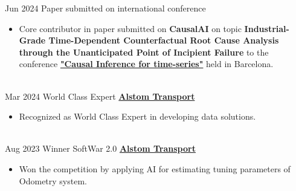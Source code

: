 \documentclass[letterpaper]{DS_class_file} %
\begin{document}
\begin{twenty} %
	\twentyitem
	{Jun 2024}
	{}
    {\hspace{0.3cm} Paper submitted on international conference}
	{}
	{}
	{\begin{itemize}
        \item Core contributor in paper submitted on \textbf{CausalAI} on topic \textbf{Industrial-Grade Time-Dependent Counterfactual Root Cause Analysis through the Unanticipated Point of Incipient Failure} to the conference \href{https://sites.google.com/view/ci4ts2024/home}{\textbf{"Causal Inference for time-series"}} held in Barcelona.
	\end{itemize}}
	\\
    \twentyitem
	{Mar 2024}
	{}
	{\hspace{0.3cm}World Class Expert}
	{\href{https://www.alstom.com/alstom-india}{\textbf{Alstom Transport}}}
	{}
	{\begin{itemize}
			\item Recognized as World Class Expert in developing data solutions.
	\end{itemize}}
    \\
    \twentyitem
	{Aug 2023}
	{}
	{\hspace{0.3cm}Winner SoftWar 2.0}
	{\href{https://www.alstom.com/alstom-india}{\textbf{Alstom Transport}}}
	{}
	{\begin{itemize}
			\item Won the competition by applying AI for estimating tuning parameters of Odometry system.
	\end{itemize}}
    
\end{twenty}


\end{document}
